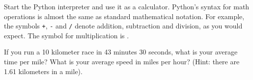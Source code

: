 \begin{exercise}
	Start the Python interpreter and use it as a calculator.
	Python's syntax for math operations is almost the same as
	standard mathematical notation.  For example, the symbols
	{\tt +}, {\tt -} and {\tt /} denote addition, subtraction
	and division, as you would expect.  The symbol for
	multiplication is {\tt *}.
	
	If you run a 10 kilometer race in 43 minutes 30 seconds, what is your
	average time per mile?  What is your average speed in miles per hour?
	(Hint: there are 1.61 kilometers in a mile).
	
\end{exercise}
